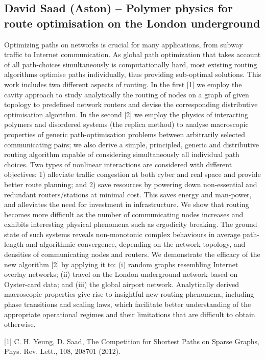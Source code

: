 \documentclass[10pt]{article}
\begin{document}
\begin{multicols}{2}
\subsection*{David Saad (Aston) – Polymer physics for route optimisation on the London underground}

Optimizing paths on networks is crucial for many applications, from subway traffic to Internet communication. As global path optimization that takes account of all path-choices simultaneously is computationally hard, most existing routing algorithms optimise paths individually, thus providing sub-optimal solutions. This work includes two different aspects of routing. In the first [1] we employ the cavity approach to study analytically the routing of nodes on a graph of given topology to predefined network routers and devise the corresponding distributive optimisation algorithm. In the second [2] we employ the physics of interacting polymers and disordered systems (the replica method) to analyse macroscopic properties of generic path-optimisation problems between arbitrarily selected communicating pairs; we also derive a simple, principled, generic and distributive routing algorithm capable of considering simultaneously all individual path choices. Two types of nonlinear interactions are considered with different objectives: 1) alleviate traffic congestion at both cyber and real space and provide better route planning; and 2) save resources by powering down non-essential and redundant routers/stations at minimal cost. This saves energy and man-power, and alleviates the need for investment in infrastructure. We show that routing becomes more difficult as the number of communicating nodes increases and exhibits interesting physical phenomena such as ergodicity breaking. The ground state of such systems reveals non-monotonic complex behaviours in average path-length and algorithmic convergence, depending on the network topology, and densities of communicating nodes and routers. We demonstrate the efficacy of the new algorithm [2] by applying it to: (i) random graphs resembling Internet overlay networks; (ii) travel on the London underground network based on Oyster-card data; and (iii) the global airport network. Analytically derived macroscopic properties give rise to insightful new routing phenomena, including phase transitions and scaling laws, which facilitate better understanding of the appropriate operational regimes and their limitations that are difficult to obtain otherwise.

    [1] C. H. Yeung, D. Saad, The Competition for Shortest Paths on Sparse Graphs, Phys. Rev. Lett., 108, 208701 (2012).


\end{multicols}
\end{document}
